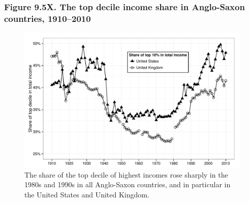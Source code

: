 \documentclass[t]{beamer}\usepackage[]{graphicx}\usepackage[]{color}
\newenvironment{knitrout}{}{} %
\begin{document}
\begin{frame}[label=Figure_9_5X]
\frametitle{Figure 9.5X. The top decile income share in Anglo-Saxon countries, 1910--2010}
\begin{figure}[t]
\begin{minipage}[b]{\textwidth}
\centering
\begin{knitrout}\footnotesize
{}\color{fgcolor}

{\centering \includegraphics[width=1\linewidth]{figures/bw/Figure_9_5X} 

}



\end{knitrout}
\caption{The share of the top decile of highest incomes rose sharply in the 1980s and 1990s in all Anglo-Saxon countries, and in particular in the United States and United Kingdom.}
\end{minipage}
\end{figure}
\end{frame}
\end{document}
